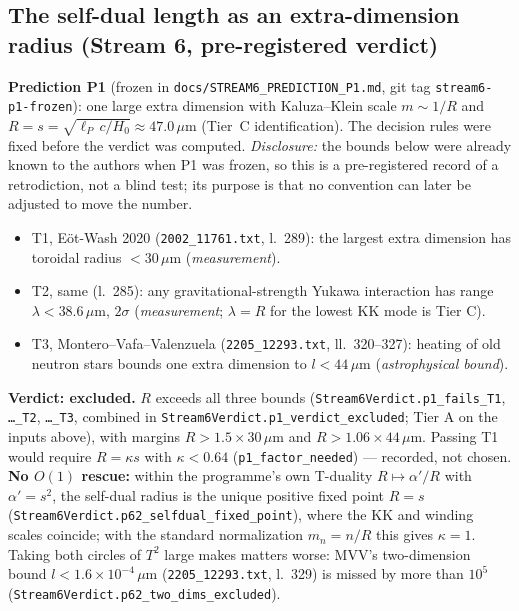 \documentclass[11pt,a4paper]{article}
\theoremstyle{remark}
\begin{document}
\subsection{The self-dual length as an extra-dimension radius (Stream 6, pre-registered verdict)}
\label{sec:stream6-verdict}
\textbf{Prediction P1} (frozen in \texttt{docs/\discretionary{}{}{}STREAM6\_\discretionary{}{}{}PREDICTION\_\discretionary{}{}{}P1.md},
git tag \texttt{stream6-p1-frozen}): one large extra dimension with Kaluza--Klein scale $m\sim1/R$ and
$R=s=\sqrt{\ell_P\,c/H_0}\approx47.0\,\mu$m (Tier~C identification). The decision rules were fixed before
the verdict was computed. \emph{Disclosure:} the bounds below were already known to the authors when
P1 was frozen, so this is a pre-registered record of a retrodiction, not a blind test; its purpose is
that no convention can later be adjusted to move the number.
\begin{itemize}
  \item T1, E\"ot-Wash 2020 \cite{LeeEotWash2020} (\texttt{2002\_11761.txt}, l.~289): the largest extra
    dimension has toroidal radius $<30\,\mu$m (\emph{measurement}).
  \item T2, same (l.~285): any gravitational-strength Yukawa interaction has range $\lambda<38.6\,\mu$m,
    $2\sigma$ (\emph{measurement}; $\lambda=R$ for the lowest KK mode is Tier C).
  \item T3, Montero--Vafa--Valenzuela \cite{MVV2022} (\texttt{2205\_12293.txt}, ll.~320--327): heating of old
    neutron stars bounds one extra dimension to $l<44\,\mu$m (\emph{astrophysical bound}).
\end{itemize}
\textbf{Verdict: excluded.} $R$ exceeds all three bounds
(\texttt{Stream6Verdict.\discretionary{}{}{}p1\_\discretionary{}{}{}fails\_\discretionary{}{}{}T1}, \texttt{\dots\_T2}, \texttt{\dots\_T3},
combined in \texttt{Stream6Verdict.\discretionary{}{}{}p1\_\discretionary{}{}{}verdict\_\discretionary{}{}{}excluded}; Tier A on the
inputs above), with margins $R>1.5\times30\,\mu$m and $R>1.06\times44\,\mu$m. Passing T1 would require
$R=\kappa s$ with $\kappa<0.64$ (\texttt{p1\_\discretionary{}{}{}factor\_\discretionary{}{}{}needed}) --- recorded, not chosen.
\textbf{No $O(1)$ rescue:} within the programme's own T-duality $R\mapsto\alpha'/R$ with $\alpha'=s^2$, the
self-dual radius is the unique positive fixed point $R=s$
(\texttt{Stream6Verdict.\discretionary{}{}{}p62\_\discretionary{}{}{}selfdual\_\discretionary{}{}{}fixed\_\discretionary{}{}{}point}), where the KK and
winding scales coincide; with the standard normalization $m_n=n/R$ this gives $\kappa=1$. Taking both
circles of $T^2$ large makes matters worse: MVV's two-dimension bound $l<1.6\times10^{-4}\,\mu$m
(\texttt{2205\_12293.txt}, l.~329) is missed by more than $10^5$
(\texttt{Stream6Verdict.\discretionary{}{}{}p62\_\discretionary{}{}{}two\_\discretionary{}{}{}dims\_\discretionary{}{}{}excluded}).
\end{document}
